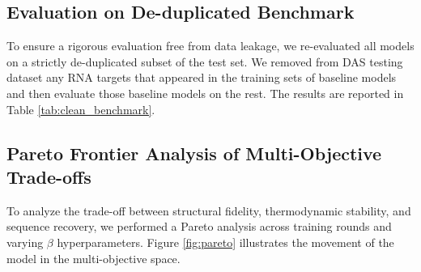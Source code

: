 {%
\subsection{{Evaluation on De-duplicated Benchmark}}
\label{subsec:dedup}

{
To ensure a rigorous evaluation free from data leakage, we re-evaluated all models on a strictly de-duplicated subset of the test set. We removed from DAS testing dataset any RNA targets that appeared in the training sets of baseline models and then evaluate those baseline models on the rest. The results are reported in Table \ref{tab:clean_benchmark}.

\begin{table}[htbp]
\centering
\caption{Performance comparison on the strict De-duplicated Test Set. RiboPO achieves the best balance of structural fidelity (RMSD) and thermodynamic stability (MFE) without relying on data leakage.}
\label{tab:clean_benchmark}
\end{table}
}

\subsection{{Pareto Frontier Analysis of Multi-Objective Trade-offs}}
\label{subsec:pareto}

{
To analyze the trade-off between structural fidelity, thermodynamic stability, and sequence recovery, we performed a Pareto analysis across training rounds and varying $\beta$ hyperparameters. Figure \ref{fig:pareto} illustrates the movement of the model in the multi-objective space.

}}
